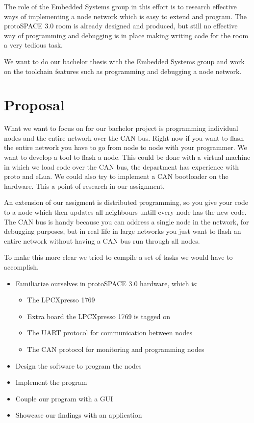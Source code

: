\documentclass[twocolumn]{article}
\begin{document}
	The role of the Embedded Systems group in this effort is to research effective ways of implementing a node network which is easy to extend and program.
	The protoSPACE 3.0 room is already designed and produced, but still no effective way of programming and debugging is in place making writing code for the room a very tedious task.
	
	We want to do our bachelor thesis with the Embedded Systems group and work on the toolchain features such as programming and debugging a node network.

\section*{Proposal}
	What we want to focus on for our bachelor project is programming individual nodes and the entire network over the CAN bus.
	Right now if you want to flash the entire network you have to go from node to node with your programmer.
	We want to develop a tool to flash a node.
	This could be done with a virtual machine in which we load code over the CAN bus, the department has experience with proto and eLua.
	We could also try to implement a CAN bootloader on the hardware.
	This a point of research in our assignment.
	
	An extension of our assigment is distributed programming, so you give your code to a node which then updates all neighbours untill every node has the new code.
	The CAN bus is handy because you can address a single node in the network, for debugging purposes, but in real life in large networks you just want to flash an entire network without having a CAN bus run through all nodes.
	
	To make this more clear we tried to compile a set of tasks we would have to accomplish.
	\begin{itemize}
		\item Familiarize ourselves in protoSPACE 3.0 hardware, which is:
		\begin{itemize}
			\item The LPCXpresso 1769
			\item Extra board the LPCXpresso 1769 is tagged on
			\item The UART protocol for communication between nodes
			\item The CAN protocol for monitoring and programming nodes
		\end{itemize}
		\item Design the software to program the nodes
		\item Implement the program
		\item Couple our program with a GUI
		\item Showcase our findings with an application
	\end{itemize}
	
\end{document}
